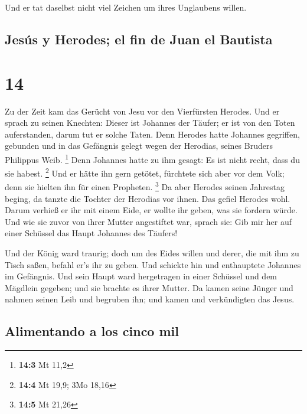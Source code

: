  Und er tat daselbst nicht viel Zeichen um ihres
Unglaubens willen.

\hypertarget{jesuxfas-y-herodes-el-fin-de-juan-el-bautista}{%
\subsection{Jesús y Herodes; el fin de Juan el
Bautista}\label{jesuxfas-y-herodes-el-fin-de-juan-el-bautista}}

\hypertarget{section-13}{%
\section{14}\label{section-13}}

 Zu der Zeit kam das Gerücht von Jesu vor den Vierfürsten
Herodes.  Und er sprach zu seinen Knechten: Dieser ist
Johannes der Täufer; er ist von den Toten auferstanden, darum tut er
solche Taten.  Denn Herodes hatte Johannes gegriffen,
gebunden und in das Gefängnis gelegt wegen der Herodias, seines Bruders
Philippus Weib. \footnote{\textbf{14:3} Mt 11,2}  Denn
Johannes hatte zu ihm gesagt: Es ist nicht recht, dass du sie habest.
\footnote{\textbf{14:4} Mt 19,9; 3Mo 18,16}  Und er hätte
ihn gern getötet, fürchtete sich aber vor dem Volk; denn sie hielten ihn
für einen Propheten. \footnote{\textbf{14:5} Mt 21,26}  Da
aber Herodes seinen Jahrestag beging, da tanzte die Tochter der Herodias
vor ihnen. Das gefiel Herodes wohl.  Darum verhieß er ihr
mit einem Eide, er wollte ihr geben, was sie fordern würde.
 Und wie sie zuvor von ihrer Mutter angestiftet war,
sprach sie: Gib mir her auf einer Schüssel das Haupt Johannes des
Täufers!

 Und der König ward traurig; doch um des Eides willen und
derer, die mit ihm zu Tisch saßen, befahl er's ihr zu geben.
 Und schickte hin und enthauptete Johannes im Gefängnis.
 Und sein Haupt ward hergetragen in einer Schüssel und
dem Mägdlein gegeben; und sie brachte es ihrer Mutter. 
Da kamen seine Jünger und nahmen seinen Leib und begruben ihn; und kamen
und verkündigten das Jesus.

\hypertarget{alimentando-a-los-cinco-mil}{%
\subsection{Alimentando a los cinco
mil}\label{alimentando-a-los-cinco-mil}}

